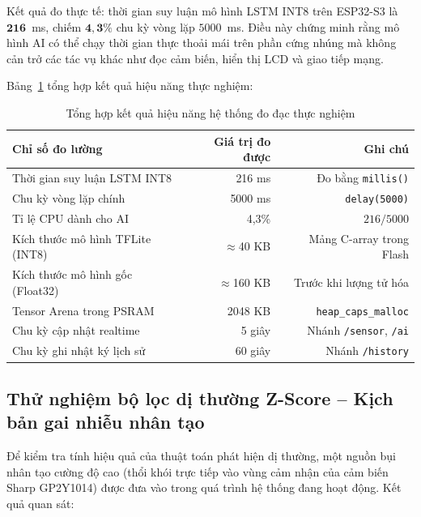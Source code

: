 \documentclass[12pt,a4paper]{article}
\begin{document}
Kết quả đo thực tế: thời gian suy luận mô hình LSTM INT8 trên ESP32-S3 là $\mathbf{216}$~ms, chiếm $\mathbf{4{,}3\%}$ chu kỳ vòng lặp $5000$~ms. Điều này chứng minh rằng mô hình AI có thể chạy thời gian thực thoải mái trên phần cứng nhúng mà không cản trở các tác vụ khác như đọc cảm biến, hiển thị LCD và giao tiếp mạng.

Bảng~\ref{tab:performance} tổng hợp kết quả hiệu năng thực nghiệm:

\begin{table}[H]
    \centering
    \caption{Tổng hợp kết quả hiệu năng hệ thống đo đạc thực nghiệm}
    \label{tab:performance}
    \begin{tabular}{lrr}
        \toprule
        \textbf{Chỉ số đo lường} & \textbf{Giá trị đo được} & \textbf{Ghi chú} \\
        \midrule
        Thời gian suy luận LSTM INT8 & 216 ms & Đo bằng \texttt{millis()} \\
        Chu kỳ vòng lặp chính & 5000 ms & \texttt{delay(5000)} \\
        Tỉ lệ CPU dành cho AI & 4,3\% & $216/5000$ \\
        Kích thước mô hình TFLite (INT8) & $\approx$40 KB & Mảng C-array trong Flash \\
        Kích thước mô hình gốc (Float32) & $\approx$160 KB & Trước khi lượng tử hóa \\
        Tensor Arena trong PSRAM & 2048 KB & \texttt{heap\_caps\_malloc} \\
        Chu kỳ cập nhật realtime & 5 giây & Nhánh \texttt{/sensor}, \texttt{/ai} \\
        Chu kỳ ghi nhật ký lịch sử & 60 giây & Nhánh \texttt{/history} \\
        \bottomrule
    \end{tabular}
\end{table}

\subsection{Thử nghiệm bộ lọc dị thường Z-Score -- Kịch bản gai nhiễu nhân tạo}

Để kiểm tra tính hiệu quả của thuật toán phát hiện dị thường, một nguồn bụi nhân tạo cường độ cao (thổi khói trực tiếp vào vùng cảm nhận của cảm biến Sharp GP2Y1014) được đưa vào trong quá trình hệ thống đang hoạt động. Kết quả quan sát:
\end{document}
